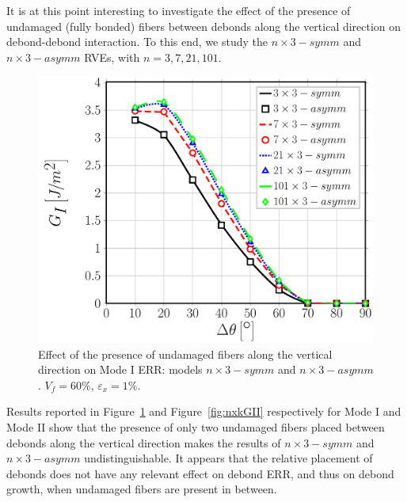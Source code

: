 \documentclass[smallextended]{svjour3}       %
\begin{document}
It is at this point interesting to investigate the effect of the presence of undamaged (fully bonded) fibers between debonds along the vertical direction on debond-debond interaction. To this end, we study the $n\times 3-symm$ and $n\times 3-asymm$ RVEs, with $n=3,7,21,101$.

\begin{figure}[!h]
\centering
\includegraphics[width=\textwidth]{nxk-coupling-vf60-GI.pdf}
\caption{Effect of the presence of undamaged fibers along the vertical direction on Mode I ERR: models $n\times 3-symm$ and $n\times 3-asymm$. $V_{f}=60\%$, $\varepsilon_{x}=1\%$.}\label{fig:nxkGI}
\end{figure}

Results reported in Figure~\ref{fig:nxkGI} and Figure~\ref{fig:nxkGII} respectively for Mode I and Mode II show that the presence of only two undamaged fibers placed between debonds along the vertical direction makes the results of $n\times 3-symm$ and $n\times 3-asymm$ undistinguishable. It appears that the relative placement of debonds does not have any relevant effect on debond ERR, and thus on debond growth, when undamaged fibers are present in between.
\end{document}
